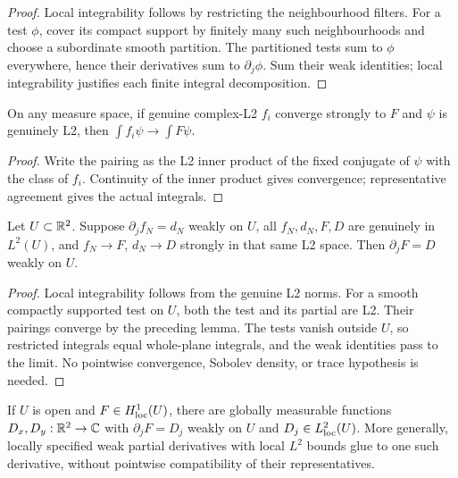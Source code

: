 \begin{proof}
\leanok
Local integrability follows by restricting the neighbourhood filters.
For a test $\phi$, cover its compact support by finitely many such
neighbourhoods and choose a subordinate smooth partition.
The partitioned tests sum to $\phi$ everywhere, hence their derivatives
sum to $\partial_j\phi$. Sum their weak identities; local integrability
justifies each finite integral decomposition.
\end{proof}

\begin{lemma}
\label{lem:l2-test-pairing-limit}
\leanok
On any measure space, if genuine complex-L2 $f_i$ converge strongly to $F$ and
$\psi$ is genuinely L2, then $\int f_i\psi\to\int F\psi$.
\end{lemma}

\begin{proof}
\leanok
Write the pairing as the L2 inner product of the fixed conjugate of $\psi$
with the class of $f_i$. Continuity of the inner product gives convergence;
representative agreement gives the actual integrals.
\end{proof}

\begin{lemma}
\label{lem:weak-partial-l2-limit}
\leanok
Let $U\subset\mathbb{R}^2$. Suppose $\partial_jf_N=d_N$ weakly on $U$,
all $f_N,d_N,F,D$ are genuinely in $L^2(U)$, and
$f_N\to F$, $d_N\to D$ strongly in that same L2 space.
Then $\partial_jF=D$ weakly on $U$.
\end{lemma}

\begin{proof}
\leanok
Local integrability follows from the genuine L2 norms.
For a smooth compactly supported test on $U$, both the test and its partial
are L2. Their pairings converge by the preceding lemma.
The tests vanish outside $U$, so restricted integrals equal whole-plane
integrals, and the weak identities pass to the limit.
No pointwise convergence, Sobolev density, or trace hypothesis is needed.
\end{proof}

\begin{lemma}
\label{lem:local-h1-specified-gradient}
\leanok
If $U$ is open and $F\in H^1_{\rm loc}(U)$, there are globally measurable
functions $D_x,D_y:\mathbb{R}^2\to\mathbb{C}$ with $\partial_jF=D_j$ weakly on $U$
and $D_j\in L^2_{\rm loc}(U)$.
More generally, locally specified weak partial derivatives with local
$L^2$ bounds glue to one such derivative, without pointwise compatibility
of their representatives.
\end{lemma}

